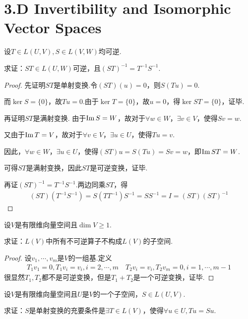\section{3.D Invertibility and Isomorphic Vector Spaces}

\begin{problem}[1]\label{3.D.1}
    设\(T \in L(U,V),S \in L(V,W)\)均可逆.

    求证：\(ST \in L(U,W)\)可逆，且\((ST)^{-1}=T^{-1}S^{-1}\).
\end{problem}

\begin{proof}
    先证明\(ST\)是单射变换.令\((ST)(u)=0\)，则\(S(Tu)=0\).

    而\(\ker S=\{0\}\)，故\(Tu=0\).由于\(\ker T=\{0\}\)，故\(u=0\)，得\(\ker ST=\{0\}\)，证毕.
    
    再证明\(ST\)是满射变换.
    由于\(\operatorname{Im} S=W\)，故对于\(\forall w \in W\)，\(\exists v \in V\)，使得\(Sv=w\).
    
    又由于\(\operatorname{Im} T=V\)，故对于\(\forall v \in V\)，\(\exists u \in U\)，使得\(Tu=v\).
    
    因此，\(\forall w \in W\)，\(\exists u \in U\)，使得\((ST)u=S(Tu)=Sv=w\)，即\(\operatorname{Im} ST=W\).
    
    可得\(ST\)是满射变换，因此\(ST\)是可逆变换，证毕.
    
    再证\((ST)^{-1}=T^{-1}S^{-1}\).两边同乘\(ST\)，得
    \begin{align*}
        (ST)(T^{-1}S^{-1})=S(TT^{-1})S^{-1}=SS^{-1}=I=(ST)(ST)^{-1}
    \end{align*}
\end{proof}

\begin{problem}[2]\label{3.D.2}
    设\(V\)是有限维向量空间且\(\dim V \geq 1\).
    
    求证：\(L(V)\)中所有不可逆算子不构成\(L(V)\)的子空间.    
\end{problem}

\begin{proof}
    设\(v_1,\cdots,v_m\)是\(V\)的一组基.定义
    \begin{align*}
        T_1v_1=0,T_1v_i=v_i,i=2,\cdots,m \quad
        T_2v_i=v_i,T_2v_m=0,i=1,\cdots,m-1
    \end{align*}
    很显然\(T_1,T_2\)都不是可逆变换，但是\(T_1+T_2\)是一个可逆变换，证毕.    
\end{proof}

\begin{problem}[3]\label{3.D.3}
    设\(V\)是有限维向量空间且\(U\)是\(V\)的一个子空间，\(S \in L(U,V)\).

    求证：\(S\)是单射变换的充要条件是\(\exists T \in L(V)\)，使得\(\forall u \in U,Tu=Su\).        
\end{problem}

